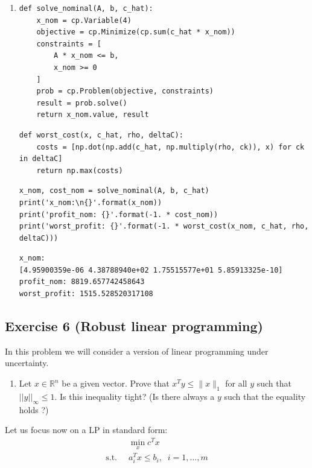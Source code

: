 \documentclass[11pt]{article}
\begin{document}
\begin{solution}
\begin{enumerate}
    \item
        \begin{verbatim}
def solve_nominal(A, b, c_hat):
    x_nom = cp.Variable(4)
    objective = cp.Minimize(cp.sum(c_hat * x_nom))
    constraints = [
        A * x_nom <= b,
        x_nom >= 0
    ]
    prob = cp.Problem(objective, constraints)
    result = prob.solve()
    return x_nom.value, result
        \end{verbatim}
        \begin{verbatim}
def worst_cost(x, c_hat, rho, deltaC):
    costs = [np.dot(np.add(c_hat, np.multiply(rho, ck)), x) for ck in deltaC]
    return np.max(costs)
        \end{verbatim}
        \begin{verbatim}
x_nom, cost_nom = solve_nominal(A, b, c_hat)
print('x_nom:\n{}'.format(x_nom))
print('profit_nom: {}'.format(-1. * cost_nom))
print('worst_profit: {}'.format(-1. * worst_cost(x_nom, c_hat, rho, deltaC)))
        \end{verbatim}
        \begin{verbatim}
x_nom:
[4.95900359e-06 4.38788940e+02 1.75515577e+01 5.85913325e-10]
profit_nom: 8819.657742458643
worst_profit: 1515.528520317108
        \end{verbatim}
\end{enumerate}
\end{solution}

\newpage
\subsection*{Exercise 6 (Robust linear programming)}

In this problem we will consider a version of linear programming under uncertainty.
\begin{enumerate}
    \item Let $x \in \mathbb{R}^n$ be a given vector. Prove that $x^Ty \leq \|x\|_1$ for all $y$ such that $||y||_{\infty} \leq 1$. Is this inequality tight? (Is there always a $y$ such that the equality holds ?)
\end{enumerate}

Let us focus now on a LP in standard form:
\begin{align}
    &\min_x c^Tx \nonumber \\
    \label{LP}
    \text{s.t.} \; \; &a_i^Tx \leq b_i, \; \; i = 1,...,m
\end{align}
\end{document}
